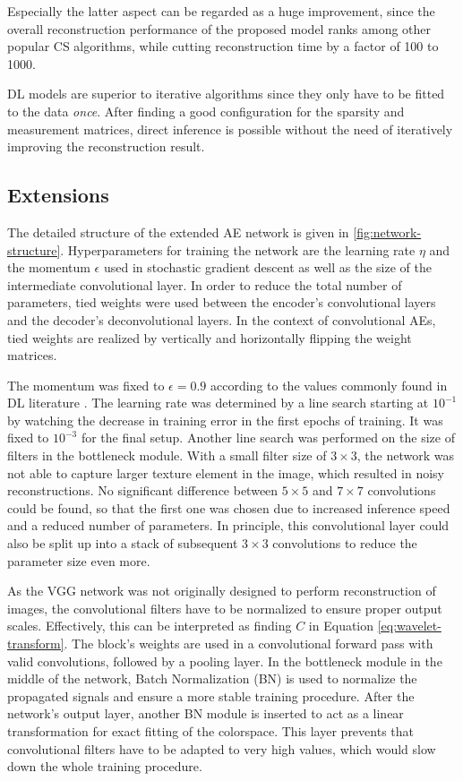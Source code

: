 \documentclass[10pt,twocolumn,a4paper]{article}
\newcommand{\abbr}[2]{#1 (#2)}
\begin{document}
Especially the latter aspect can be regarded as a huge improvement, since the overall reconstruction performance of the proposed model ranks among other popular CS algorithms, while cutting reconstruction time by a factor of 100 to 1000.

DL models are superior to iterative algorithms since they only have to be fitted to the data \emph{once}.
After finding a good configuration for the sparsity and measurement matrices, direct inference is possible without the need of iteratively improving the reconstruction result.

\subsection{Extensions}

The detailed structure of the extended AE network is given in \autoref{fig:network-structure}.
Hyperparameters for training the network are the learning rate $\eta$ and the momentum $\epsilon$ used in stochastic gradient descent as well as the size of the intermediate convolutional layer.
In order to reduce the total number of parameters, tied weights were used between the encoder's convolutional layers and the decoder's deconvolutional layers.
In the context of convolutional AEs, tied weights are realized by vertically and horizontally flipping the weight matrices.

The momentum was fixed to $\epsilon = 0.9$ according to the values commonly found in DL literature \cite{Simonyan14, Szegedy15}.
The learning rate was determined by a line search starting at $10^{-1}$ by watching the decrease in training error in the first epochs of training.
It was fixed to $10^{-3}$ for the final setup.
Another line search was performed on the size of filters in the bottleneck module.
With a small filter size of $3 \times 3$, the network was not able to capture larger texture element in the image, which resulted in noisy reconstructions.
No significant difference between $5 \times 5$ and $7 \times 7$ convolutions could be found, so that the first one was chosen due to increased inference speed and a reduced number of parameters.
In principle, this convolutional layer could also be split up into a stack of subsequent $3 \times 3$ convolutions to reduce the parameter size even more.

As the VGG network was not originally designed to perform reconstruction of images, the convolutional filters have to be normalized to ensure proper output scales.
Effectively, this can be interpreted as finding $C$ in Equation \eqref{eq:wavelet-transform}.
The block's weights are used in a convolutional forward pass with valid convolutions, followed by a pooling layer.
In the bottleneck module in the middle of the network, \abbr{Batch Normalization}{BN} is used to normalize the propagated signals and ensure a more stable training procedure.
After the network's output layer, another BN module is inserted to act as a linear transformation for exact fitting of the colorspace.
This layer prevents that convolutional filters have to be adapted to very high values, which would slow down the whole training procedure.
\end{document}
